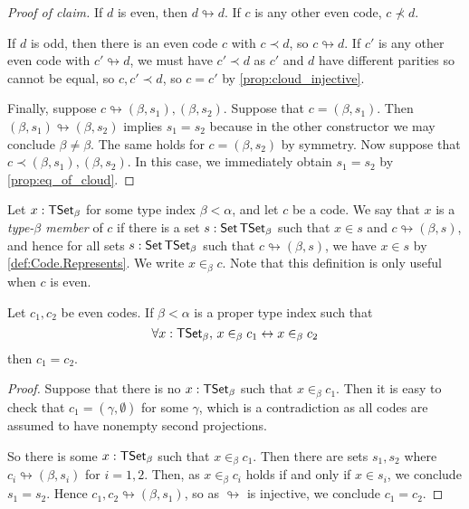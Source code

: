 \begin{proof}[Proof of claim]
  If \( d \) is even, then \( d \looparrowright d \).
  If \( c \) is any other even code, \( c \nprec d \).

  If \( d \) is odd, then there is an even code \( c \) with \( c \prec d \), so \( c \looparrowright d \).
  If \( c' \) is any other even code with \( c' \looparrowright d \), we must have \( c' \prec d \) as \( c' \) and \( d \) have different parities so cannot be equal, so \( c, c' \prec d \), so \( c = c' \) by \cref{prop:cloud_injective}.

  Finally, suppose \( c \looparrowright (\beta, s_1), (\beta, s_2) \).
  Suppose that \( c = (\beta, s_1) \).
  Then \( (\beta, s_1) \looparrowright (\beta, s_2) \) implies \( s_1 = s_2 \) because in the other constructor we may conclude \( \beta \neq \beta \).
  The same holds for \( c = (\beta, s_2) \) by symmetry.
  Now suppose that \( c \prec (\beta, s_1), (\beta, s_2) \).
  In this case, we immediately obtain \( s_1 = s_2 \) by \cref{prop:eq_of_cloud}.
\end{proof}
\begin{proposition}[extensionality]
  \label{prop:Code.ext}
  Let \( x : \mathsf{TSet}_\beta \) for some type index \( \beta < \alpha \), and let \( c \) be a code.
  We say that \( x \) is a \emph{type-\( \beta \) member} of \( c \) if there is a set \( s : \operatorname{\mathsf{Set}} \mathsf{TSet}_\beta \) such that \( x \in s \) and \( c \looparrowright (\beta, s) \), and hence for all sets \( s : \operatorname{\mathsf{Set}} \mathsf{TSet}_\beta \) such that \( c \looparrowright (\beta, s) \), we have \( x \in s \) by \cref{def:Code.Represents}.
  We write \( x \in_\beta c \).
  Note that this definition is only useful when \( c \) is even.

  Let \( c_1, c_2 \) be even codes.
  If \( \beta < \alpha \) is a proper type index such that
  \[ \forall x : \mathsf{TSet}_\beta,\, x \in_\beta c_1 \leftrightarrow x \in_\beta c_2 \]
  then \( c_1 = c_2 \).
\end{proposition}
\begin{proof}
  Suppose that there is no \( x : \mathsf{TSet}_\beta \) such that \( x \in_\beta c_1 \).
  Then it is easy to check that \( c_1 = (\gamma, \emptyset) \) for some \( \gamma \), which is a contradiction as all codes are assumed to have nonempty second projections.

  So there is some \( x : \mathsf{TSet}_\beta \) such that \( x \in_\beta c_1 \).
  Then there are sets \( s_1, s_2 \) where \( c_i \looparrowright (\beta, s_i) \) for \( i = 1, 2 \).
  Then, as \( x \in_\beta c_i \) holds if and only if \( x \in s_i \), we conclude \( s_1 = s_2 \).
  Hence \( c_1, c_2 \looparrowright (\beta, s_1) \), so as \( \looparrowright \) is injective, we conclude \( c_1 = c_2 \).
\end{proof}

